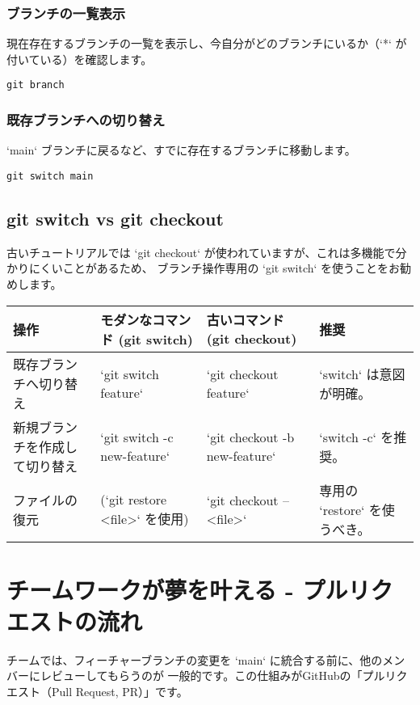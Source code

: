 \documentclass{ltjsarticle}
\begin{document}
\subsubsection{ブランチの一覧表示}
現在存在するブランチの一覧を表示し、今自分がどのブランチにいるか（`*` が付いている）を確認します。
\begin{verbatim}
git branch
\end{verbatim}

\subsubsection{既存ブランチへの切り替え}
`main` ブランチに戻るなど、すでに存在するブランチに移動します。
\begin{verbatim}
git switch main
\end{verbatim}

\subsection{git switch vs git checkout}
古いチュートリアルでは `git checkout` が使われていますが、これは多機能で分かりにくいことがあるため、
ブランチ操作専用の `git switch` を使うことをお勧めします。
\begin{tabularx}{\textwidth}{|l|l|l|X|}
\hline
操作 & モダンなコマンド (git switch) & 古いコマンド (git checkout) & 推奨 \\ 
\hline
既存ブランチへ切り替え & `git switch feature` & `git checkout feature` & `switch` は意図が明確。 \\ 
新規ブランチを作成して切り替え & `git switch -c new-feature` & `git checkout -b new-feature` & `switch -c` を推奨。 \\ 
ファイルの復元 & (`git restore <file>` を使用) & `git checkout -- <file>` & 専用の `restore` を使うべき。 \\
\hline
\end{tabularx}

\section{チームワークが夢を叶える - プルリクエストの流れ}
チームでは、フィーチャーブランチの変更を `main` に統合する前に、他のメンバーにレビューしてもらうのが
一般的です。この仕組みがGitHubの「プルリクエスト（Pull Request, PR）」です。
\end{document}
